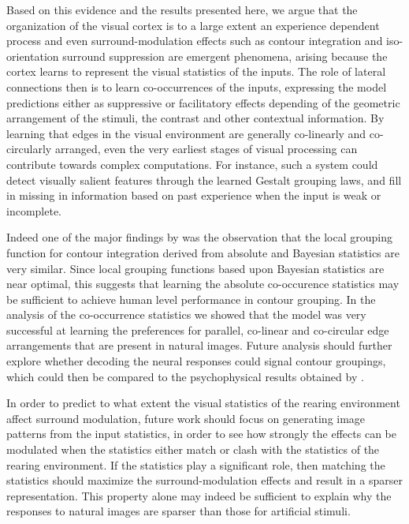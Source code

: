 Based on this evidence and the results presented here, we argue that
the organization of the visual cortex is to a large extent an
experience dependent process and even surround-modulation effects such
as contour integration and iso-orientation surround suppression are
emergent phenomena, arising because the cortex learns to represent the
visual statistics of the inputs. The role of lateral connections then
is to learn co-occurrences of the inputs, expressing the model
predictions either as suppressive or facilitatory effects depending of
the geometric arrangement of the stimuli, the contrast and other
contextual information. By learning that edges in the visual
environment are generally co-linearly and co-circularly arranged, even
the very earliest stages of visual processing can contribute towards
complex computations. For instance, such a system could detect
visually salient features through the learned Gestalt grouping laws,
and fill in missing in information based on past experience when the
input is weak or incomplete.

Indeed one of the major findings by \cite{Geisler2001} was the
observation that the local grouping function for contour integration
derived from absolute and Bayesian statistics are very similar. Since
local grouping functions based upon Bayesian statistics are near
optimal, this suggests that learning the absolute co-occurence
statistics may be sufficient to achieve human level performance in
contour grouping. In the analysis of the co-occurrence statistics we
showed that the model was very successful at learning the preferences
for parallel, co-linear and co-circular edge arrangements that are
present in natural images. Future analysis should further explore
whether decoding the neural responses could signal contour groupings,
which could then be compared to the psychophysical results obtained by
\cite{Geisler2001}.

In order to predict to what extent the visual statistics of the
rearing environment affect surround modulation, future
work should focus on generating image patterns from the input
statistics, in order to see how strongly the effects can be modulated
when the statistics either match or clash with the statistics of the
rearing environment. If the statistics play a significant role, then
matching the statistics should maximize the surround-modulation
effects and result in a sparser representation. This property alone
may indeed be sufficient to explain why the responses to natural
images are sparser than those for artificial stimuli.

